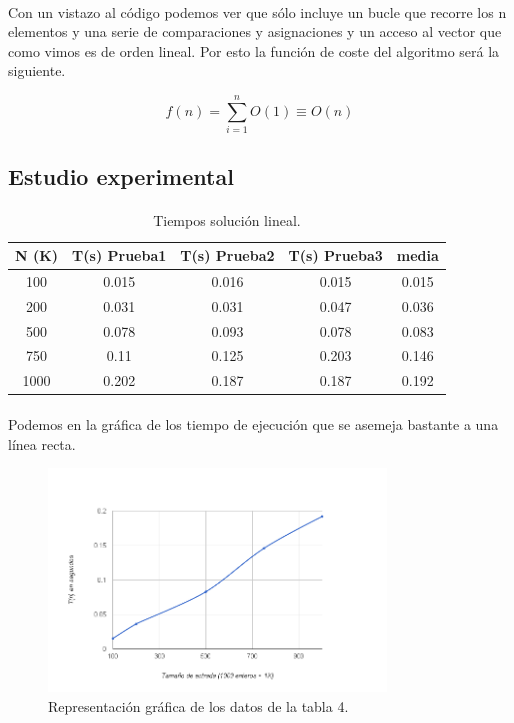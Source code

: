 \documentclass[es]{ifirak}
\begin{document}
\paragraph{}
Con un vistazo al código podemos ver que sólo incluye un bucle que recorre los n elementos y una serie de comparaciones y asignaciones y un acceso al vector que como vimos es de orden lineal. Por esto la función de coste del algoritmo será la siguiente.

$$f(n)= \sum_{i=1}^{n} O(1) \equiv O(n)$$

\newpage
\subsection{Estudio experimental}
\paragraph{}
\begin{center}
	\begin{table}[htbp]
		\centering
		\begin{tabular}{c|c|c|c|c}
			N (K) & T(s) Prueba1 & T(s) Prueba2 & T(s) Prueba3 & media \\
			\hline
		100 &	0.015&	0.016&	0.015&	0.015\\
		200 & 	0.031&	0.031&	0.047&	0.036\\
		500 &	0.078&	0.093&	0.078&	0.083\\
		750 &	0.11&	0.125&	0.203&	0.146\\
		1000 & 	0.202&	0.187&	0.187&	0.192\\
		
		\end{tabular}
		\caption{Tiempos solución lineal.}\label{table}
	\end{table}
\end{center}

\paragraph{}
Podemos en la gráfica de los tiempo de ejecución que se asemeja bastante a una línea recta.

\begin{figure}[htbp]
	\centering
	\includegraphics[width=0.8\textwidth]{KadaneGrafica.png}
	\caption{Representación gráfica de los datos de la tabla 4.}\label{figure}
\end{figure}
\end{document}
